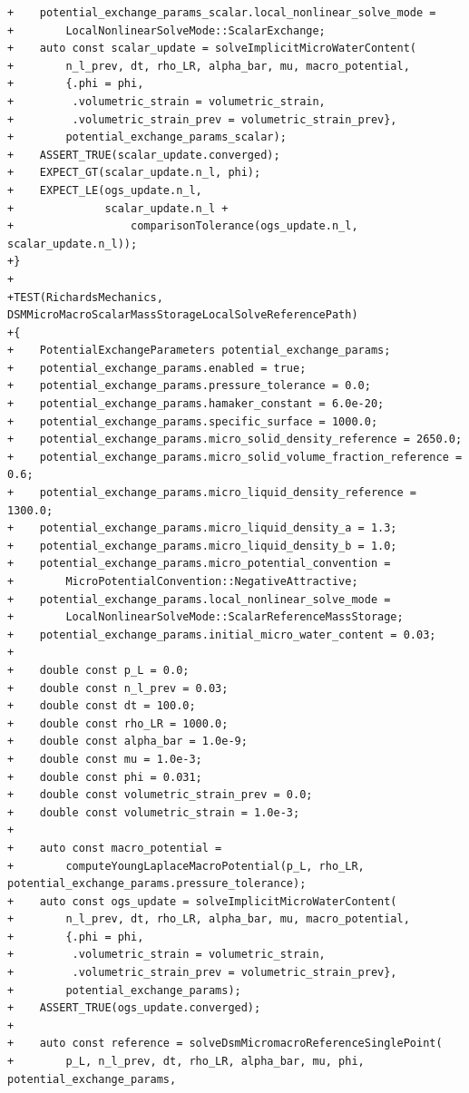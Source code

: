 \documentclass[10pt]{article}
\begin{document}
\begin{lstlisting}
+    potential_exchange_params_scalar.local_nonlinear_solve_mode =
+        LocalNonlinearSolveMode::ScalarExchange;
+    auto const scalar_update = solveImplicitMicroWaterContent(
+        n_l_prev, dt, rho_LR, alpha_bar, mu, macro_potential,
+        {.phi = phi,
+         .volumetric_strain = volumetric_strain,
+         .volumetric_strain_prev = volumetric_strain_prev},
+        potential_exchange_params_scalar);
+    ASSERT_TRUE(scalar_update.converged);
+    EXPECT_GT(scalar_update.n_l, phi);
+    EXPECT_LE(ogs_update.n_l,
+              scalar_update.n_l +
+                  comparisonTolerance(ogs_update.n_l, scalar_update.n_l));
+}
+
+TEST(RichardsMechanics, DSMMicroMacroScalarMassStorageLocalSolveReferencePath)
+{
+    PotentialExchangeParameters potential_exchange_params;
+    potential_exchange_params.enabled = true;
+    potential_exchange_params.pressure_tolerance = 0.0;
+    potential_exchange_params.hamaker_constant = 6.0e-20;
+    potential_exchange_params.specific_surface = 1000.0;
+    potential_exchange_params.micro_solid_density_reference = 2650.0;
+    potential_exchange_params.micro_solid_volume_fraction_reference = 0.6;
+    potential_exchange_params.micro_liquid_density_reference = 1300.0;
+    potential_exchange_params.micro_liquid_density_a = 1.3;
+    potential_exchange_params.micro_liquid_density_b = 1.0;
+    potential_exchange_params.micro_potential_convention =
+        MicroPotentialConvention::NegativeAttractive;
+    potential_exchange_params.local_nonlinear_solve_mode =
+        LocalNonlinearSolveMode::ScalarReferenceMassStorage;
+    potential_exchange_params.initial_micro_water_content = 0.03;
+
+    double const p_L = 0.0;
+    double const n_l_prev = 0.03;
+    double const dt = 100.0;
+    double const rho_LR = 1000.0;
+    double const alpha_bar = 1.0e-9;
+    double const mu = 1.0e-3;
+    double const phi = 0.031;
+    double const volumetric_strain_prev = 0.0;
+    double const volumetric_strain = 1.0e-3;
+
+    auto const macro_potential =
+        computeYoungLaplaceMacroPotential(p_L, rho_LR, potential_exchange_params.pressure_tolerance);
+    auto const ogs_update = solveImplicitMicroWaterContent(
+        n_l_prev, dt, rho_LR, alpha_bar, mu, macro_potential,
+        {.phi = phi,
+         .volumetric_strain = volumetric_strain,
+         .volumetric_strain_prev = volumetric_strain_prev},
+        potential_exchange_params);
+    ASSERT_TRUE(ogs_update.converged);
+
+    auto const reference = solveDsmMicromacroReferenceSinglePoint(
+        p_L, n_l_prev, dt, rho_LR, alpha_bar, mu, phi, potential_exchange_params,

\end{lstlisting}
\end{document}
